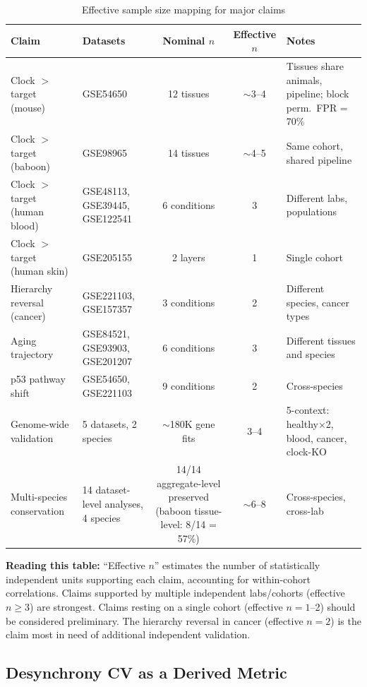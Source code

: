 \documentclass[11pt,a4paper]{article}
\begin{document}
\begin{table}[H]
\centering
\caption{Effective sample size mapping for major claims}
\label{tab:effective_n}
\begin{tabular}{p{4cm}p{3.5cm}ccp{3.5cm}}
\toprule
Claim & Datasets & Nominal $n$ & Effective $n$ & Notes \\
\midrule
Clock $>$ target (mouse) & GSE54650 & 12 tissues & $\sim$3--4 & Tissues share animals, pipeline; block perm.\ FPR = 70\% \\
Clock $>$ target (baboon) & GSE98965 & 14 tissues & $\sim$4--5 & Same cohort, shared pipeline \\
Clock $>$ target (human blood) & GSE48113, GSE39445, GSE122541 & 6 conditions & 3 & Different labs, populations \\
Clock $>$ target (human skin) & GSE205155 & 2 layers & 1 & Single cohort \\
Hierarchy reversal (cancer) & GSE221103, GSE157357 & 3 conditions & 2 & Different species, cancer types \\
Aging trajectory & GSE84521, GSE93903, GSE201207 & 6 conditions & 3 & Different tissues and species \\
p53 pathway shift & GSE54650, GSE221103 & 9 conditions & 2 & Cross-species \\
Genome-wide validation & 5 datasets, 2 species & $\sim$180K gene fits & 3--4 & 5-context: healthy$\times$2, blood, cancer, clock-KO \\
Multi-species conservation & 14 dataset-level analyses, 4 species & 14/14 aggregate-level preserved (baboon tissue-level: 8/14 = 57\%) & $\sim$6--8 & Cross-species, cross-lab \\
\bottomrule
\end{tabular}
\end{table}

\textbf{Reading this table:} ``Effective $n$'' estimates the number of statistically independent units supporting each claim, accounting for within-cohort correlations. Claims supported by multiple independent labs/cohorts (effective $n \geq 3$) are strongest. Claims resting on a single cohort (effective $n = 1$--2) should be considered preliminary. The hierarchy reversal in cancer (effective $n = 2$) is the claim most in need of additional independent validation.

\subsection{Desynchrony CV as a Derived Metric}
\end{document}
